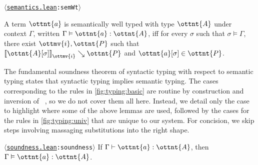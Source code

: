 \documentclass[a4paper,UKenglish,cleveref,autoref,thm-restate]{lipics-v2021}
\newcommand{\citep}[1]{\cite{#1}}
\newcommand{\repo}{https://github.com/ionathanch/TTBFL}
\newcommand{\thmref}[2]{%
  $\langle$\href{\repo/tree/main/src/#1}{\texttt{#1}}\texttt{:#2}$\rangle$%
}
\begin{document}
\begin{definition} \thmref{semantics.lean}{semWt}
  A term $\ottnt{a}$ is semantically well typed with type $\ottnt{A}$ under context $\Gamma$,
  written $ \Gamma  \vDash  \ottnt{a}  :  \ottnt{A} $, iff for every $\sigma$ such that $ \sigma  \vDash  \Gamma $,
  there exist $\ottmv{i}, \ottnt{P}$ such that
  $ \mathopen{\llbracket}   \ottnt{A} [  \sigma  ]   \mathclose{\rrbracket}_{ \ottmv{i} } \searrow  \ottnt{P} $ and $  \ottnt{a} [  \sigma  ]   \in  \ottnt{P} $.
\end{definition}

The fundamental soundness theorem of syntactic typing with respect to semantic typing
states that syntactic typing implies semantic typing.
The cases corresponding to the rules in \cref{fig:typing:basic} are routine
by construction and inversion of ~\citep{lr-pearl},
so we do not cover them all here.
Instead, we detail only the  case to highlight
where some of the above lemmas are used,
followed by the cases for the rules in \cref{fig:typing:univ}
that are unique to our system.
For concision, we skip steps involving massaging substitutions into the right shape.

\begin{theorem}[Soundness] \thmref{soundness.lean}{soundness} \label{thm:soundness}
  If $ \Gamma  \vdash  \ottnt{a}  \mathrel{:}  \ottnt{A} $, then $ \Gamma  \vDash  \ottnt{a}  :  \ottnt{A} $.
\end{theorem}
\end{document}
